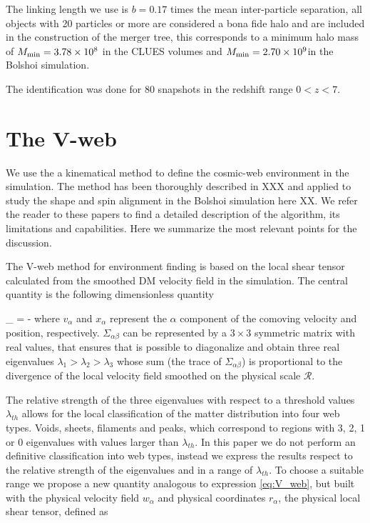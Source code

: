 \documentclass[usenatbib]{latex/mn2e}
\begin{document}
The linking length we use is $b=0.17$ times the mean inter-particle 
separation, all objects with 20 particles or more are considered a bona 
fide halo and are included in the construction of the merger tree, this 
corresponds to a minimum halo mass of $M_{\rm min}=3.78\times 10^{8}$
\hMsun in the CLUES volumes and $M_{\rm min}=2.70\times 10^{9}$\hMsun in 
the Bolshoi simulation. 


The identification was done for 80 snapshots in the redshift range $0<z<7$.


\section{The V-web}
\label{sec:Vweb}


We use the a kinematical method to define the cosmic-web environment in 
the simulation. The method has been thoroughly described in XXX and 
applied to study the shape and spin alignment in the Bolshoi simulation 
here XX. We refer the reader to these papers to find a detailed description 
of the algorithm, its limitations and capabilities. Here we summarize the
most relevant points for the discussion. 


The V-web method for environment finding is based on the local shear 
tensor calculated from the smoothed DM velocity field in the simulation.
The central quantity is the following dimensionless quantity 


{
\Sigma_{\alpha\beta} = -
}
where $v_{\alpha}$ and $x_{\alpha}$ represent the $\alpha$ component of 
the comoving velocity and position, respectively. $\Sigma_{\alpha\beta}$ 
can be represented by a $3\times 3$ symmetric matrix with real values, 
that ensures that is possible to diagonalize and obtain three real 
eigenvalues $\lambda_{1} > \lambda_{2}>\lambda_3$ whose sum (the trace of
$\Sigma_{\alpha\beta}$) is proportional to the divergence of the local 
velocity field smoothed on the physical scale ${\mathcal R}$. 


The relative strength of the three eigenvalues with respect to a threshold
values $\lambda_{th}$ allows for the local classification of the matter 
distribution into four web types. Voids, sheets, filaments and peaks, 
which correspond to regions with 3, 2, 1 or 0 eigenvalues with values 
larger than $\lambda_{th}$. In this paper we do not perform an definitive 
classification into web types, instead we express the results respect to 
the relative strength of the eigenvalues and in a range of $\lambda_{th}$.
To choose a suitable range we propose a new quantity analogous to 
expression \ref{eq:V_web}, but built with the physical velocity field 
$w_{\alpha}$ and physical coordinates $r_{\alpha}$, the physical local 
shear tensor, defined as 
\end{document}
